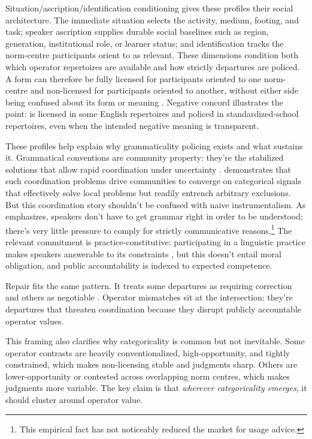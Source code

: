 \documentclass[12pt,letterpaper]{article}
\begin{document}
Situation/ascription/identification conditioning gives these profiles their social architecture. The immediate situation selects the activity, medium, footing, and task; speaker ascription supplies durable social baselines such as region, generation, institutional role, or learner status; and identification tracks the norm-centre participants orient to as relevant. These dimensions condition both which operator repertoires are available and how strictly departures are policed. A form can therefore be fully licensed for participants oriented to one norm-centre and non-licensed for participants oriented to another, without either side being confused about its form or meaning \citep{author2026varieties}. Negative concord illustrates the point:  is licensed in some English repertoires and policed in standardized-school repertoires, even when the intended negative meaning is transparent.

These profiles help explain why grammaticality policing exists and what sustains it. Grammatical conventions are community property: they're the stabilized solutions that allow rapid coordination under uncertainty \citep{clarkbrennan1991,stalnaker2002}. \textcite{oconnor2019} demonstrates that such coordination problems drive communities to converge on categorical signals that effectively solve local problems but readily entrench arbitrary exclusions. But this coordination story shouldn't be confused with naive instrumentalism. As \textcite{pullum2019} emphasizes, speakers don't have to get grammar right in order to be understood; there's very little pressure to comply for strictly communicative reasons.\footnote{This empirical fact has not noticeably reduced the market for usage advice.} The relevant commitment is practice-constitutive: participating in a linguistic practice makes speakers answerable to its constraints \citep{millar2004}, but this doesn't entail moral obligation, and public accountability is indexed to expected competence.

Repair fits the same pattern. It treats some departures as requiring correction and others as negotiable \citep{schegloffjeffersonsacks1977}. Operator mismatches sit at the intersection: they're departures that threaten coordination because they disrupt publicly accountable operator values.

{\sloppy This framing also clarifies why categoricality is common but not inevitable. Some operator contrasts are heavily conventionalized, high-opportunity, and tightly constrained, which makes non-licensing stable and judgments sharp. Others are lower-opportunity or contested across overlapping norm centres, which makes judgments more variable. The key claim is that \emph{wherever categoricality emerges}, it should cluster around operator value.\par}
\end{document}
